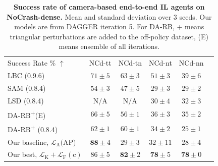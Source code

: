 \begin{table}
	\setlength{\tabcolsep}{2.67pt}
	\centering
	\begin{tabular}{lccccc}
		\toprule
		Success Rate \% $\uparrow$
		&  NCd-tt & NCd-tn  & NCd-nt & NCd-nn  \\ 
		\cmidrule(lr){1-1}\cmidrule(lr){2-5}
		LBC \cite{chen2020learning} (0.9.6) & 
		$71 \pm 5$ & $63 \pm 3$ & $51 \pm 3$ & $39 \pm 6$ \\
		SAM \cite{zhao2021sam} (0.8.4) & 
		$54 \pm 3$ & $47 \pm 5$ & $29 \pm 3$ & $29 \pm 2$ \\
		LSD \cite{ohn2020learning} (0.8.4) & 
		N/A & N/A & $30 \pm 4$ & $32 \pm 3$ \\
		DA-RB\textsuperscript{+}(E) \cite{prakash2020exploring} & 
		$66 \pm 5$ & $56 \pm 1$ & $36 \pm 3$ & $35 \pm 2$ \\
		DA-RB\textsuperscript{+} \cite{prakash2020exploring} (0.8.4)  & 
		$62 \pm 1$ & $60 \pm 1$ & $34 \pm 2$ & $25 \pm 1$ \\
		Our baseline, $\mathcal{L}_\text{A}\text{(AP)}$ & 
		$\mathbf{88} \pm 4$ & $29 \pm 3$ & $32 \pm 11$ & $28 \pm 4$ \\
		Our best, $\mathcal{L}_\text{K}+\mathcal{L}_\text{F}(\text{c})$ & 
		$86 \pm 5$ & $\mathbf{82} \pm 2$ & $\mathbf{78} \pm 5$ & $\mathbf{78} \pm 0$ \\
		\bottomrule
	\end{tabular}
	\vspace{-1ex}
	\caption{\textbf{Success rate of camera-based end-to-end IL agents on NoCrash-dense.} Mean and standard deviation over 3 seeds. Our models are from DAGGER iteration 5. For DA-RB, + means triangular perturbations are added to the off-policy dataset, (E) means ensemble of all iterations.}
	\label{table:sucess_rate_nc_dense}
	\vspace{-2ex}
\end{table}
